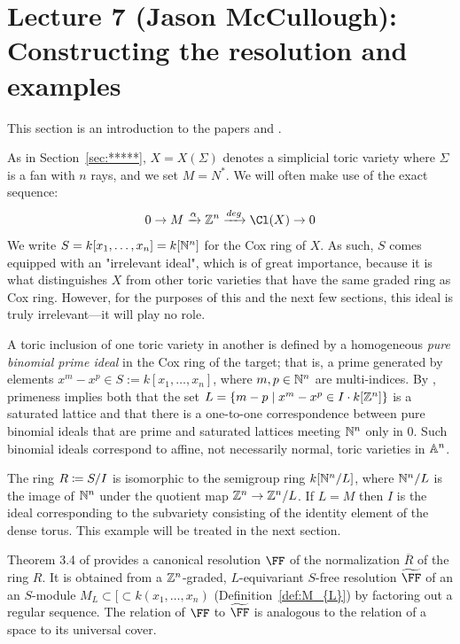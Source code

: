 \documentclass{amsart}
\begin{document}
\fi
\def\tF{{\widetilde \FF}}
\def\BT{{Bondal-Thomsen\ }}

\section{Lecture 7 (Jason McCullough): Constructing the resolution and examples}\label{lec:7-HHL-construction}
This section is an introduction to the papers \cite{BCHSY} and \cite{BH25}.

As in Section~\ref{sec:*****}, $X = X(\Sigma)$ denotes a simplicial toric variety where $\Sigma$ is a fan with $n$ rays, and we set $M = N^{*}$. We will often make use of the exact sequence:
$$
0\to M \xrightarrow {\alpha} \ZZ^{n} \xrightarrow {deg} \Cl(X) \to 0
$$
We write $S = k[x_{1},\dots,x_{n}]= k[\NN^{n}]$ for the Cox ring of $X$. As such, $S$ comes equipped with an "irrelevant ideal", which is of great importance, because it is what distinguishes $X$ from other
toric varieties that have the same graded ring as Cox ring. However, for the purposes of this and the next few sections, this ideal is truly irrelevant---it will play no role.


A toric inclusion of one toric variety in another is defined by a 
homogeneous \emph{pure binomial prime ideal}
in the Cox ring of the target; that is, a prime generated by elements $x^m-x^p \in S := k[x_1,\dots, x_n]$, where $m,p\in\NN^n$ are multi-indices. By \cite{Eisenbud-Sturmfels}, primeness implies both that
the set $L = \{m-p\mid x^m-x^p\in I \cdot k[\ZZ^n]\}$ is a saturated lattice and  that there is a one-to-one correspondence between pure binomial ideals that are prime and saturated lattices meeting
 $\NN^n$ only in 0. Such binomial ideals correspond to affine, not necessarily normal, toric varieties in $\AA^{n}$. 
 
 The ring $R \ce S/I$ is isomorphic to the semigroup ring $k[\NN^n/L]$, where $\NN^n/L$ is the image of $\NN^n$ under the quotient map $\ZZ^n\rightarrow \ZZ^n/L$.
 If $L = M $ then $I$ is the ideal corresponding to the subvariety consisting of the identity element of the dense torus. This example will be treated in the next section.


Theorem 3.4 of \cite{BCHSY} provides a canonical  resolution $\FF$ of the normalization $\overline R$
of the ring $R$. It is obtained from a $\ZZ^{n}$-graded, $L$-equivariant $S$-free resolution $\tF$ of an 
an $S$-module $M_L\subset [\subset k(x_{1}, \dots, x_{n})$ (Definition~\ref{def:M_{L}}) by factoring out a regular sequence.
The relation of $\FF$ to $\tF$ is analogous to the relation of a space to its universal cover.
\end{document}
